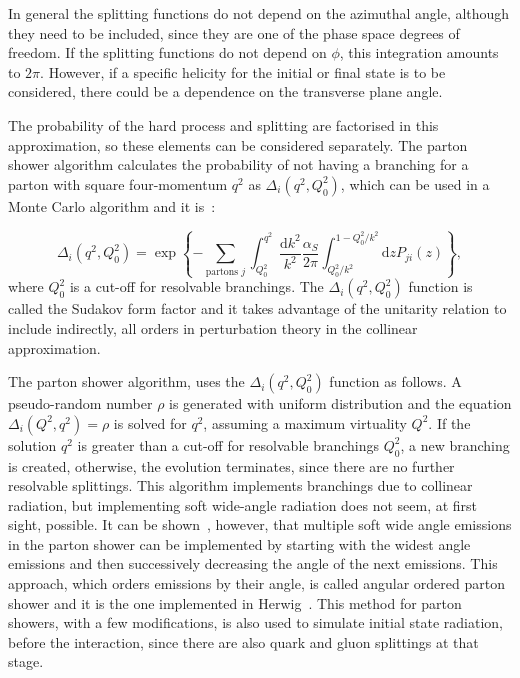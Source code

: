 In general the splitting functions do not depend
on the azimuthal angle, although they need to be included, since they
are one of the phase space degrees of freedom. If the splitting
functions do not depend on $\phi$, this integration amounts to $2\pi$.
However, if a specific helicity for the initial or final state
is to be considered, there
could be a dependence on the transverse plane angle.

The probability of the hard process and splitting are factorised in this approximation, so these elements can be considered separately.
The parton shower algorithm calculates the probability of not having a branching for a parton with square four-momentum $q^2$ as $\Delta_i(q^2, Q_0^2)$, which can be used in a Monte
Carlo algorithm and it is~\cite{lhc_event_gen,altarelli_parisi}:

\begin{equation}
\displaystyle
\Delta_i(q^2, Q_0^2) = \exp \left\{ -  \sum_{\textrm{partons } j} \int_{Q_0^2}^{q^2} \frac{\textrm{d}k^2}{k^2} \frac{\alpha_S}{2\pi} \int_{Q_0^2/k^2}^{1 - Q_0^2/k^2} \textrm{d}z P_{ji}(z) \right\},
\label{eq:pshower_delta}
\end{equation}
where $Q_0^2$ is a cut-off for resolvable branchings. The $\Delta_i(q^2, Q_0^2)$ function is called the Sudakov form factor and it takes advantage of the unitarity relation
to include indirectly, all orders in perturbation theory in the collinear approximation.

The parton shower algorithm, uses the $\Delta_i(q^2, Q_0^2)$ function as follows.
A pseudo-random number $\rho$ is generated with uniform distribution and the equation $\Delta_i(Q^2, q^2) = \rho$ is
solved for $q^2$, assuming a maximum virtuality $Q^2$.
If the solution $q^2$ is greater than a cut-off for resolvable branchings $Q_0^2$, a new branching is created, otherwise, the evolution terminates, since there
are no further resolvable splittings. This algorithm implements branchings due to collinear radiation, but implementing soft wide-angle radiation does not seem, at first sight,
possible.
It can be shown~\cite{lhc_event_gen}, however, that multiple soft wide angle emissions in the parton shower can be implemented by starting with the widest angle emissions
and then successively decreasing the angle of the next emissions.
This approach, which orders emissions by their angle, is called angular ordered parton shower and it is the one
implemented in Herwig~\cite{herwig1,herwig2}.
This method for parton showers, with a few modifications, is
also used to simulate initial state radiation, before the interaction, since there are also quark and gluon splittings
at that stage.

